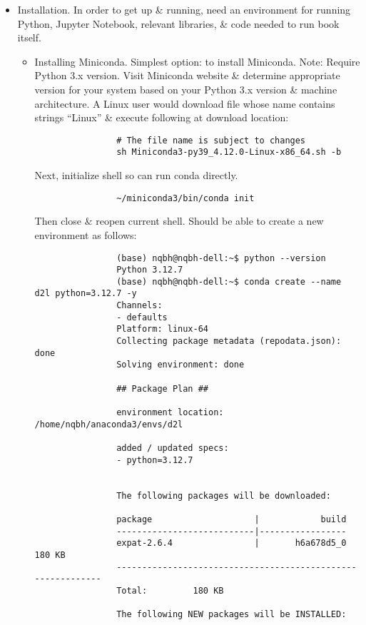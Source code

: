 \documentclass{article}
\begin{document}
\begin{enumerate}
\begin{itemize}
\begin{itemize}
\begin{itemize}
			\end{itemize}
		\end{itemize}
		\item {\sf Installation.} In order to get up \& running, need an environment for running Python, Jupyter Notebook, relevant libraries, \& code needed to run book itself.
		\begin{itemize}
			\item {\sf Installing Miniconda.} Simplest option: to install Miniconda. Note: Require Python 3.x version. Visit Miniconda website \& determine appropriate version for your system based on your Python 3.x version \& machine architecture. A Linux user would download file whose name contains strings ``Linux'' \& execute following at download location:
			\begin{verbatim}
				# The file name is subject to changes
				sh Miniconda3-py39_4.12.0-Linux-x86_64.sh -b
			\end{verbatim}
			Next, initialize shell so can run conda directly.
			\begin{verbatim}
				~/miniconda3/bin/conda init
			\end{verbatim}
			Then close \& reopen current shell. Should be able to create a new environment as follows:
			\begin{verbatim}
				(base) nqbh@nqbh-dell:~$ python --version
				Python 3.12.7
				(base) nqbh@nqbh-dell:~$ conda create --name d2l python=3.12.7 -y
				Channels:
				- defaults
				Platform: linux-64
				Collecting package metadata (repodata.json): done
				Solving environment: done
				
				## Package Plan ##
				
				environment location: /home/nqbh/anaconda3/envs/d2l
				
				added / updated specs:
				- python=3.12.7
				
				
				The following packages will be downloaded:
				
				package                    |            build
				---------------------------|-----------------
				expat-2.6.4                |       h6a678d5_0         180 KB
				------------------------------------------------------------
				Total:         180 KB
				
				The following NEW packages will be INSTALLED:
				

\end{verbatim}
\end{itemize}
\end{itemize}
\end{enumerate}
\end{document}
